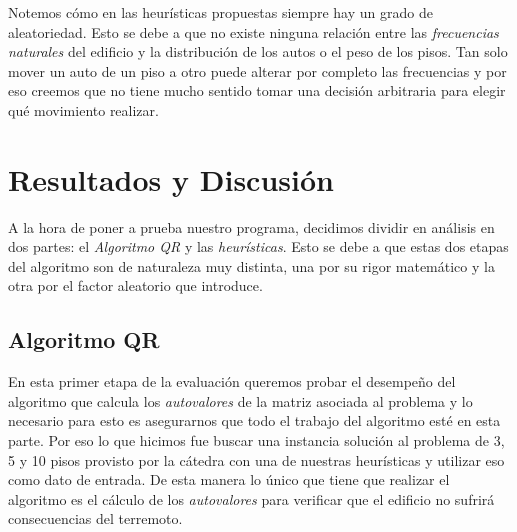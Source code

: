 \documentclass[a4paper]{article}
\begin{document}
Notemos cómo en las heurísticas propuestas siempre hay un grado de aleatoriedad. Esto se debe a que no existe ninguna relación entre las \textit{frecuencias naturales} del edificio y la  distribución de los autos o el peso de los pisos. Tan solo mover un auto de un piso a otro puede alterar por completo las frecuencias y por eso creemos que no tiene mucho sentido tomar una decisión arbitraria para elegir qué movimiento realizar. 


\newpage

\section{Resultados y Discusión}

A la hora de poner a prueba nuestro programa, decidimos dividir en análisis en dos partes: el \textit{Algoritmo QR} y las \textit{heurísticas}. Esto se debe a que estas dos etapas del algoritmo son de naturaleza muy distinta, una por su rigor matemático y la otra por el factor  aleatorio que introduce.

\subsection{Algoritmo QR}

En esta primer etapa de la evaluación queremos probar el desempeño del algoritmo que calcula los \textit{autovalores} de la matriz asociada al problema y lo necesario para esto es asegurarnos que todo el trabajo del algoritmo esté en esta parte. Por eso lo que hicimos fue buscar una instancia solución al problema de 3, 5 y 10 pisos provisto por la cátedra con una de nuestras heurísticas y utilizar eso como dato de entrada. De esta manera lo único que tiene que realizar el algoritmo es el cálculo de los \textit{autovalores} para verificar que el edificio no sufrirá consecuencias del terremoto.
\end{document}
